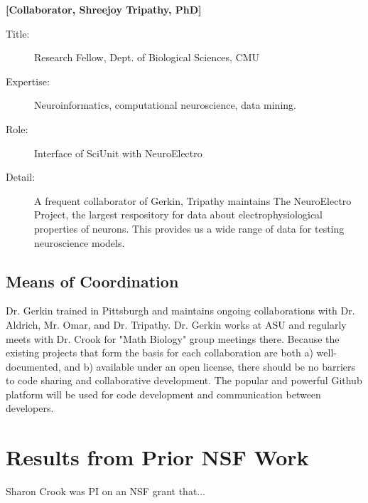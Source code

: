 \documentclass[11pt,letterpaper]{article}
\begin{document}
\textbf{[Collaborator, Shreejoy Tripathy, PhD]}
\begin{description}
\item[Title:] Research Fellow, Dept. of Biological Sciences, CMU
\item[Expertise:] Neuroinformatics, computational neuroscience, data mining.    
\item[Role:] Interface of SciUnit with NeuroElectro
\item[Detail:] A frequent collaborator of Gerkin, Tripathy maintains The NeuroElectro Project, the largest respository for data about electrophysiological properties of neurons.  This provides us a wide range of data for testing neuroscience models.  
\end{description}

\subsection{Means of Coordination}
Dr. Gerkin trained in Pittsburgh and maintains ongoing collaborations with Dr. Aldrich, Mr. Omar, and Dr. Tripathy.  Dr. Gerkin works at ASU and regularly meets with Dr. Crook for "Math Biology" group meetings there.  Because the existing projects that form the basis for each collaboration are both a) well-documented, and b) available under an open license, there should be no barriers to code sharing and collaborative development.  The popular and powerful Github platform will be used for code development and communication between developers.

\section{Results from Prior NSF Work}
Sharon Crook was PI on an NSF grant that... 
\end{document}
